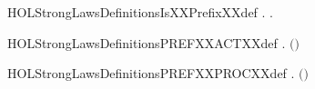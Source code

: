 \newcommand{\HOLStrongLawsDefinitionsCCSXXSIGMAXXdef}{\UseVerbatim{HOLStrongLawsDefinitionsCCSXXSIGMAXXdef}}
\begin{SaveVerbatim}{HOLStrongLawsDefinitionsIsXXPrefixXXdef}
\HOLTokenTurnstile{} \HOLSymConst{\HOLTokenForall{}}.   \HOLSymConst{\HOLTokenEquiv{}} \HOLSymConst{\HOLTokenExists{}} .  \HOLSymConst{\ensuremath{=}} \HOLSymConst{\ensuremath{\ldotp}}
\end{SaveVerbatim}
\newcommand{\HOLStrongLawsDefinitionsIsXXPrefixXXdef}{\UseVerbatim{HOLStrongLawsDefinitionsIsXXPrefixXXdef}}
\begin{SaveVerbatim}{HOLStrongLawsDefinitionsPREFXXACTXXdef}
\HOLTokenTurnstile{} \HOLSymConst{\HOLTokenForall{}} .  \ensuremath{(}\HOLSymConst{\ensuremath{\ldotp}}\ensuremath{)} \HOLSymConst{\ensuremath{=}} 
\end{SaveVerbatim}
\newcommand{\HOLStrongLawsDefinitionsPREFXXACTXXdef}{\UseVerbatim{HOLStrongLawsDefinitionsPREFXXACTXXdef}}
\begin{SaveVerbatim}{HOLStrongLawsDefinitionsPREFXXPROCXXdef}
\HOLTokenTurnstile{} \HOLSymConst{\HOLTokenForall{}} .  \ensuremath{(}\HOLSymConst{\ensuremath{\ldotp}}\ensuremath{)} \HOLSymConst{\ensuremath{=}} 
\end{SaveVerbatim}
\newcommand{\HOLStrongLawsDefinitionsPREFXXPROCXXdef}{\UseVerbatim{HOLStrongLawsDefinitionsPREFXXPROCXXdef}}
